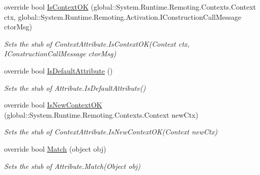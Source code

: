 \begin{DoxyCompactItemize}
override bool \hyperlink{class_system_1_1_runtime_1_1_remoting_1_1_contexts_1_1_fakes_1_1_stub_context_attribute_afdc0eb24688e5817d5742ea6dc090c92}{Is\-Context\-O\-K} (global\-::\-System.\-Runtime.\-Remoting.\-Contexts.\-Context ctx, global\-::\-System.\-Runtime.\-Remoting.\-Activation.\-I\-Construction\-Call\-Message ctor\-Msg)
\begin{DoxyCompactList}\small\item\em Sets the stub of Context\-Attribute.\-Is\-Context\-O\-K(\-Context ctx, I\-Construction\-Call\-Message ctor\-Msg)\end{DoxyCompactList}\item 
override bool \hyperlink{class_system_1_1_runtime_1_1_remoting_1_1_contexts_1_1_fakes_1_1_stub_context_attribute_af11c83fbdb27c95da045940a195185a0}{Is\-Default\-Attribute} ()
\begin{DoxyCompactList}\small\item\em Sets the stub of Attribute.\-Is\-Default\-Attribute()\end{DoxyCompactList}\item 
override bool \hyperlink{class_system_1_1_runtime_1_1_remoting_1_1_contexts_1_1_fakes_1_1_stub_context_attribute_a1301119cedce38160027da52ff1c8778}{Is\-New\-Context\-O\-K} (global\-::\-System.\-Runtime.\-Remoting.\-Contexts.\-Context new\-Ctx)
\begin{DoxyCompactList}\small\item\em Sets the stub of Context\-Attribute.\-Is\-New\-Context\-O\-K(\-Context new\-Ctx)\end{DoxyCompactList}\item 
override bool \hyperlink{class_system_1_1_runtime_1_1_remoting_1_1_contexts_1_1_fakes_1_1_stub_context_attribute_ab1ad6b10f6ed101498cf8404b0e34dba}{Match} (object obj)
\begin{DoxyCompactList}\small\item\em Sets the stub of Attribute.\-Match(\-Object obj)\end{DoxyCompactList}\end{DoxyCompactItemize}

